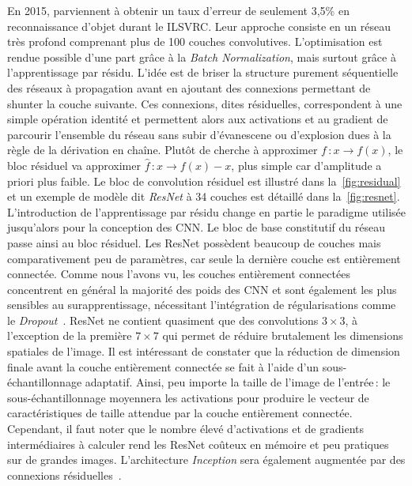 En 2015, \citet{he_deep_2016} parviennent à obtenir un taux d'erreur de seulement 3,5\% en reconnaissance d'objet durant le \gls{ILSVRC}. Leur approche consiste en un réseau très profond comprenant plus de 100 couches convolutives. L'optimisation est rendue possible d'une part grâce à la \emph{Batch Normalization}, mais surtout grâce à l'apprentissage par résidu. L'idée est de briser la structure purement séquentielle des réseaux à propagation avant en ajoutant des connexions permettant de shunter la couche suivante. Ces connexions, dites résiduelles, correspondent à une simple opération identité et permettent alors aux activations et au gradient de parcourir l'ensemble du réseau sans subir d'évanescene ou d'explosion dues à la règle de la dérivation en chaîne. Plutôt de cherche à approximer $f\,: x \rightarrow f(x)$, le bloc résiduel va approximer $\hat{f}\,: x \rightarrow f(x) - x$, plus simple car d'amplitude a priori plus faible. Le bloc de convolution résiduel est illustré dans la~\cref{fig:residual} et un exemple de modèle dit \emph{ResNet} à 34 couches est détaillé dans la~\cref{fig:resnet}. L'introduction de l'apprentissage par résidu change en partie le paradigme utilisée jusqu'alors pour la conception des \gls{CNN}. Le bloc de base constitutif du réseau passe ainsi au bloc résiduel.
Les ResNet possèdent beaucoup de couches mais comparativement peu de paramètres, car seule la dernière couche est entièrement connectée. Comme nous l'avons vu, les couches entièrement connectées concentrent en général la majorité des poids des \gls{CNN} et sont également les plus sensibles au surapprentissage, nécessitant l'intégration de régularisations comme le \emph{Dropout}~\cite{srivastava_dropout_2014}. ResNet ne contient quasiment que des convolutions $3\times3$, à l'exception de la première $7\times7$ qui permet de réduire brutalement les dimensions spatiales de l'image. Il est intéressant de constater que la réduction de dimension finale avant la couche entièrement connectée se fait à l'aide d'un sous-échantillonnage adaptatif. Ainsi, peu importe la taille de l'image de l'entrée\,: le sous-échantillonnage moyennera les activations pour produire le vecteur de caractéristiques de taille attendue par la couche entièrement connectée. Cependant, il faut noter que le nombre élevé d'activations et de gradients intermédiaires à calculer rend les ResNet coûteux en mémoire et peu pratiques sur de grandes images. L'architecture \emph{Inception} sera également augmentée par des connexions résiduelles~\cite{szegedy_inception-v4_2016}.


